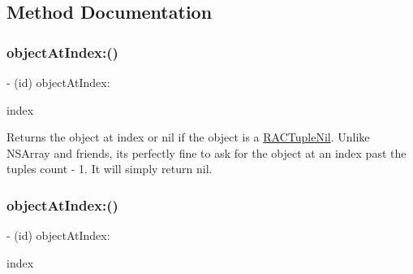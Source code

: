 \subsection{Method Documentation}
\mbox{\label{interface_r_a_c_tuple_a70c9deecd1588c4544493a48dfc20660}} 
\subsubsection{\texorpdfstring{object\+At\+Index\+:()}{objectAtIndex:()}\hspace{0.1cm}{\footnotesize\ttfamily [1/3]}}
{\footnotesize\ttfamily -\/ (id) object\+At\+Index\+: \begin{DoxyParamCaption}\item[{(N\+S\+U\+Integer)}]{index }\end{DoxyParamCaption}}

Returns the object at {\ttfamily index} or nil if the object is a \mbox{\hyperlink{interface_r_a_c_tuple_nil}{R\+A\+C\+Tuple\+Nil}}. Unlike N\+S\+Array and friends, it\textquotesingle{}s perfectly fine to ask for the object at an index past the tuple\textquotesingle{}s count -\/ 1. It will simply return nil. \mbox{\label{interface_r_a_c_tuple_a70c9deecd1588c4544493a48dfc20660}} 
\subsubsection{\texorpdfstring{object\+At\+Index\+:()}{objectAtIndex:()}\hspace{0.1cm}{\footnotesize\ttfamily [2/3]}}
{\footnotesize\ttfamily -\/ (id) object\+At\+Index\+: \begin{DoxyParamCaption}\item[{(N\+S\+U\+Integer)}]{index }\end{DoxyParamCaption}}

